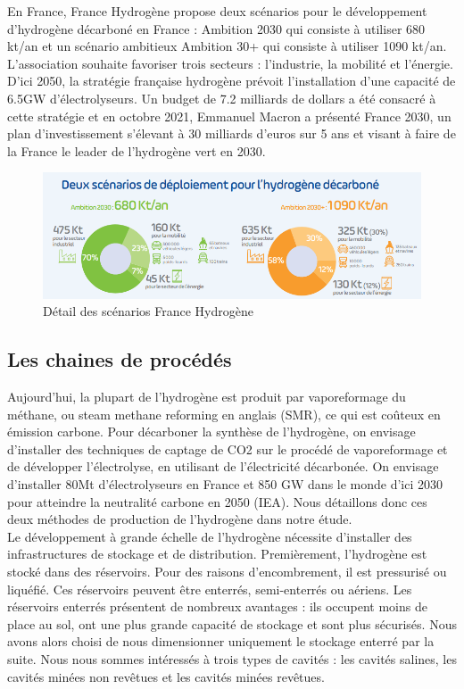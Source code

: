 \documentclass[11pt,french,a4paper]{article}
\begin{document}
En France, France Hydrogène propose deux scénarios pour le développement d’hydrogène décarboné en France : Ambition 2030 qui consiste à utiliser 680 kt/an et un scénario ambitieux Ambition 30+ qui consiste à utiliser 1090 kt/an. L'association souhaite favoriser trois secteurs : l’industrie, la mobilité et l’énergie. D’ici 2050, la stratégie française hydrogène prévoit l’installation d’une capacité de 6.5GW d’électrolyseurs. Un budget de 7.2 milliards de dollars a été consacré à cette stratégie et en octobre 2021, Emmanuel Macron a présenté France 2030, un plan d’investissement s’élevant à 30 milliards d’euros sur 5 ans et visant à faire de la France le leader de l’hydrogène vert en 2030. \\

\begin{figure}[h]
\centering
\includegraphics[width=.9\linewidth]{image/chap1/ambitions_scenarios.PNG}
\caption{Détail des scénarios France Hydrogène \cite{hydrogene_2021}}
\end{figure}

\subsection{Les chaines de procédés}

Aujourd’hui, la plupart de l’hydrogène est produit par vaporeformage du méthane, ou steam methane reforming en anglais (SMR), ce qui est coûteux en émission carbone. Pour décarboner la synthèse de l’hydrogène, on envisage d’installer des techniques de captage de CO2 sur le procédé de vaporeformage et de développer l’électrolyse, en utilisant de l’électricité décarbonée. On envisage d’installer 80Mt d’électrolyseurs en France et 850 GW dans le monde d’ici 2030 pour atteindre la neutralité carbone en 2050 (IEA). 
Nous détaillons donc ces deux méthodes de production de l’hydrogène dans notre étude. \\ 


Le développement à grande échelle de l’hydrogène nécessite d’installer des infrastructures de stockage et de distribution. Premièrement, l’hydrogène est stocké dans des réservoirs. Pour des raisons d’encombrement, il est pressurisé ou liquéfié. Ces réservoirs peuvent être enterrés, semi-enterrés ou aériens. Les réservoirs enterrés présentent de nombreux avantages : ils occupent moins de place au sol, ont une plus grande capacité de stockage et sont plus sécurisés. Nous avons alors choisi de nous dimensionner uniquement le stockage enterré par la suite. Nous nous sommes intéressés à trois types de cavités : les cavités salines, les cavités minées non revêtues et les cavités minées revêtues. \\
\end{document}
